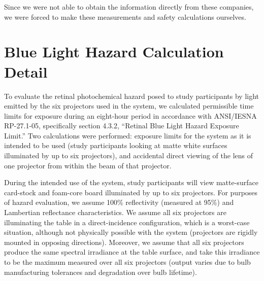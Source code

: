 \documentclass[10pt]{article}
\begin{document}
Since we were not able to obtain the information directly from these
companies, we were forced to make these measurements and safety
calculations ourselves.  




\section{Blue Light Hazard Calculation Detail}

To evaluate the retinal photochemical hazard posed to study
participants by light emitted by the six projectors used in the
system, we calculated permissible time limits for exposure during an
eight-hour period in accordance with ANSI/IESNA RP-27.1-05,
specifically section 4.3.2, ``Retinal Blue Light Hazard Exposure
Limit.''  Two calculations were performed: exposure limits for the
system as it is intended to be used (study participants looking at
matte white surfaces illuminated by up to six projectors), and
accidental direct viewing of the lens of one projector from within the
beam of that projector.

During the intended use of the system, study participants will view
matte-surface card-stock and foam-core board illuminated by up to six
projectors.  For purposes of hazard evaluation, we assume 100\%
reflectivity (measured at 95\%) and Lambertian reflectance
characteristics.  We assume all six projectors are illuminating the
table in a direct-incidence configuration, which is a worst-case
situation, although not physically possible with the system
(projectors are rigidly mounted in opposing directions).  Moreover, we
assume that all six projectors produce the same spectral irradiance
at the table surface, and take this irradiance to be the maximum
measured over all six projectors (output varies due to bulb
manufacturing tolerances and degradation over bulb lifetime).
\end{document}
